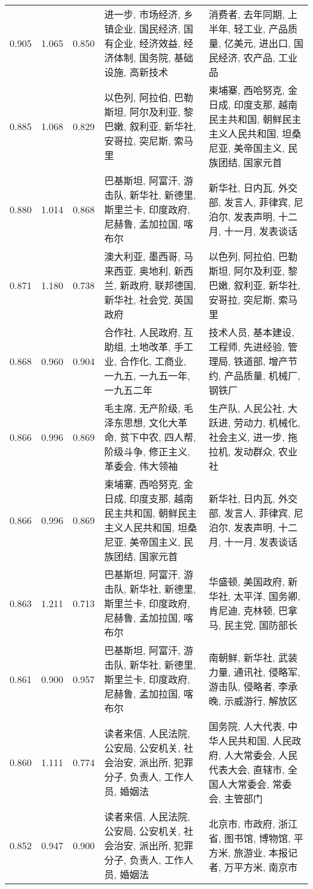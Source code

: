 \begin{tabular}{cccp{5cm}p{5cm}}
0.905 & 1.065 & 0.850 & 进一步, 市场经济, 乡镇企业, 国民经济, 国有企业, 经济效益, 经济体制, 国务院, 基础设施, 高新技术 & 消费者, 去年同期, 上半年, 轻工业, 产品质量, 亿美元, 进出口, 国民经济, 农产品, 工业品 \\
0.885 & 1.068 & 0.829 & 以色列, 阿拉伯, 巴勒斯坦, 阿尔及利亚, 黎巴嫩, 叙利亚, 新华社, 安哥拉, 突尼斯, 索马里 & 柬埔寨, 西哈努克, 金日成, 印度支那, 越南民主共和国, 朝鲜民主主义人民共和国, 坦桑尼亚, 美帝国主义, 民族团结, 国家元首 \\
0.880 & 1.014 & 0.868 & 巴基斯坦, 阿富汗, 游击队, 新华社, 新德里, 斯里兰卡, 印度政府, 尼赫鲁, 孟加拉国, 喀布尔 & 新华社, 日内瓦, 外交部, 发言人, 菲律宾, 尼泊尔, 发表声明, 十二月, 十一月, 发表谈话 \\
0.871 & 1.180 & 0.738 & 澳大利亚, 墨西哥, 马来西亚, 奥地利, 新西兰, 新政府, 联邦德国, 新华社, 社会党, 英国政府 & 以色列, 阿拉伯, 巴勒斯坦, 阿尔及利亚, 黎巴嫩, 叙利亚, 新华社, 安哥拉, 突尼斯, 索马里 \\
0.868 & 0.960 & 0.904 & 合作社, 人民政府, 互助组, 土地改革, 手工业, 合作化, 工商业, 一九五, 一九五一年, 一九五二年 & 技术人员, 基本建设, 工程师, 先进经验, 管理局, 铁道部, 增产节约, 产品质量, 机械厂, 钢铁厂 \\
0.866 & 0.996 & 0.869 & 毛主席, 无产阶级, 毛泽东思想, 文化大革命, 贫下中农, 四人帮, 阶级斗争, 修正主义, 革委会, 伟大领袖 & 生产队, 人民公社, 大跃进, 劳动力, 机械化, 社会主义, 进一步, 拖拉机, 发动群众, 农业社 \\
0.866 & 0.996 & 0.869 & 柬埔寨, 西哈努克, 金日成, 印度支那, 越南民主共和国, 朝鲜民主主义人民共和国, 坦桑尼亚, 美帝国主义, 民族团结, 国家元首 & 新华社, 日内瓦, 外交部, 发言人, 菲律宾, 尼泊尔, 发表声明, 十二月, 十一月, 发表谈话 \\
0.863 & 1.211 & 0.713 & 巴基斯坦, 阿富汗, 游击队, 新华社, 新德里, 斯里兰卡, 印度政府, 尼赫鲁, 孟加拉国, 喀布尔 & 华盛顿, 美国政府, 新华社, 太平洋, 国务卿, 肯尼迪, 克林顿, 巴拿马, 民主党, 国防部长 \\
0.861 & 0.900 & 0.957 & 巴基斯坦, 阿富汗, 游击队, 新华社, 新德里, 斯里兰卡, 印度政府, 尼赫鲁, 孟加拉国, 喀布尔 & 南朝鲜, 新华社, 武装力量, 通讯社, 侵略军, 游击队, 侵略者, 李承晚, 示威游行, 解放区 \\
0.860 & 1.111 & 0.774 & 读者来信, 人民法院, 公安局, 公安机关, 社会治安, 派出所, 犯罪分子, 负责人, 工作人员, 婚姻法 & 国务院, 人大代表, 中华人民共和国, 人民政府, 人大常委会, 人民代表大会, 直辖市, 全国人大常委会, 常委会, 主管部门 \\
0.852 & 0.947 & 0.900 & 读者来信, 人民法院, 公安局, 公安机关, 社会治安, 派出所, 犯罪分子, 负责人, 工作人员, 婚姻法 & 北京市, 市政府, 浙江省, 图书馆, 博物馆, 平方米, 旅游业, 本报记者, 万平方米, 南京市 \\

\end{tabular}
